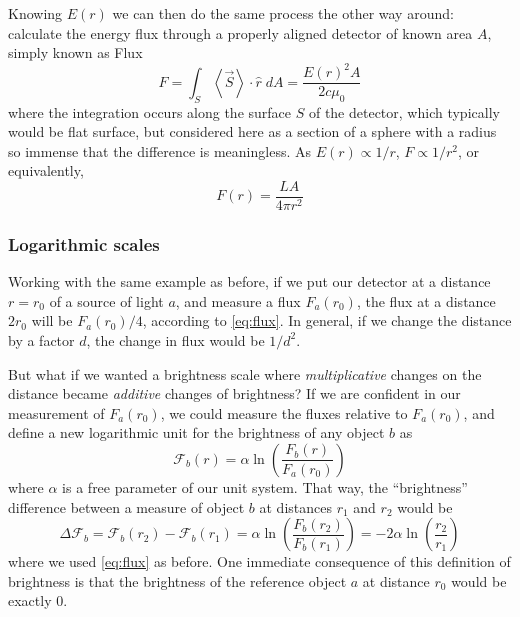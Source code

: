 	Knowing $E(r)$ we can then do the same process the other way around: 
	calculate the energy flux through a properly aligned detector of known area $A$,
	simply known as Flux	
	\begin{equation}
		F = \int_{S} \left<\vec S\right> \cdot \hat r \; dA = \frac{E(r)^2 A}{2 c \mu_0}
	\end{equation}
	where the integration occurs along the surface $S$ of the detector, which typically would be flat surface, 
	but considered here as a section of a sphere with a radius so immense that the difference is meaningless.
	As $E(r)\propto 1/r$, $F\propto 1/r^2$,  or equivalently, 
	\begin{equation}
		F(r)=\frac{L A}{4\pi r^2} \label{eq:flux}
	\end{equation}
	
	\subsubsection{Logarithmic scales}
	
	Working with the same example as before, if we put our detector at a distance $r=r_0$ of a source of light $a$,
	and measure a flux $F_a(r_0)$,
	the flux at a distance $2r_0$ will be $F_a(r_0)/4$, according to \autoref{eq:flux}. 
	In general, if we change the distance by a factor $d$, the change in flux would be $1/d^2$.
	
	But what if we wanted a brightness scale where \textit{multiplicative} changes on the distance became \textit{additive} changes of brightness?
	If we are confident in our measurement of $F_a(r_0)$, we could measure the fluxes relative to $F_a(r_0)$, 
	and define a new logarithmic unit for the brightness of any object $b$ as
	\begin{equation}
		\mathcal{F}_b(r) = \alpha \ln\left(\frac{F_b(r)}{F_a(r_0)}\right) \label{eq:general-magnitude}
	\end{equation}
	where $\alpha$ is a free parameter of our unit system. 
	That way, the \enquote{brightness} difference between a measure of object $b$ at distances $r_1$ and $r_2$ would be
	\begin{equation}
		\Delta \mathcal{F}_b = \mathcal{F}_b(r_2) - \mathcal{F}_b(r_1) 
			= \alpha \ln\left(\frac{F_b(r_2)}{F_b(r_1)}\right)
			= -2\alpha \ln\left(\frac{r_2}{r_1}\right)
			\label{eq:general-distance-modulus}
	\end{equation}
	where we used \autoref{eq:flux} as before. 
	One immediate consequence of this definition of brightness is that the brightness of the reference object $a$ at distance $r_0$ would be exactly 0.
	
